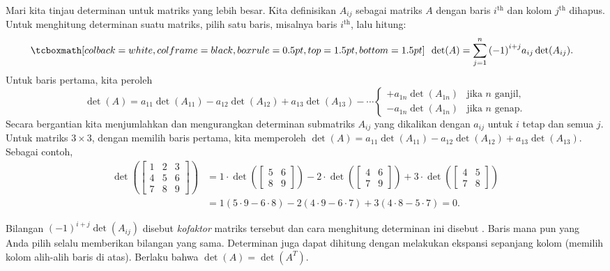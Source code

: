 \medskip

Mari kita tinjau determinan untuk matriks yang lebih besar.  Kita definisikan $A_{ij}$ sebagai
matriks $A$ dengan baris $i^{\text{th}}$ dan kolom $j^{\text{th}}$
dihapus.  Untuk menghitung determinan suatu matriks, pilih satu baris, misalnya
baris $i^{\text{th}}$, lalu hitung:
\begin{equation*}
\mybxbg{~~
\det (A) =
\sum_{j=1}^n
{(-1)}^{i+j}
a_{ij} \det (A_{ij}) .
~~}
\end{equation*}
Untuk baris pertama, kita peroleh
\begin{equation*}
\det (A) =
a_{11} \det (A_{11}) -
a_{12} \det (A_{12}) +
a_{13} \det (A_{13}) -
\cdots
\begin{cases}
+ a_{1n} \det (A_{1n}) & \text{jika } n \text{ ganjil,} \\
- a_{1n} \det (A_{1n}) & \text{jika } n \text{ genap.}
\end{cases}
\end{equation*}
Secara bergantian kita menjumlahkan dan mengurangkan determinan submatriks
$A_{ij}$ yang dikalikan dengan $a_{ij}$ untuk $i$ tetap dan semua $j$.
Untuk matriks $3 \times 3$,
dengan memilih baris pertama, kita memperoleh $\det (A) = a_{11} \det (A_{11}) -
a_{12} \det (A_{12}) + a_{13} \det (A_{13})$.  Sebagai contoh,
\begin{equation*}
\begin{split}
\det \left(
\begin{bmatrix}
1 & 2 & 3 \\
4 & 5 & 6 \\
7 & 8 & 9
\end{bmatrix}
\right)
& =
1 \cdot
\det \left(
\begin{bmatrix}
5 & 6 \\
8 & 9
\end{bmatrix}
\right)
-
2 \cdot
\det \left(
\begin{bmatrix}
4 & 6 \\
7 & 9
\end{bmatrix}
\right)
+
3 \cdot
\det \left(
\begin{bmatrix}
4 & 5 \\
7 & 8
\end{bmatrix}
\right) \\
& =
1 (5 \cdot 9 - 6 \cdot 8)
-
2 (4 \cdot 9 - 6 \cdot 7)
+
3 (4 \cdot 8 - 5 \cdot 7)
= 0 .
\end{split}
\end{equation*}

Bilangan ${(-1)}^{i+j}\det(A_{ij})$ disebut
\emph{kofaktor}
matriks tersebut dan
cara menghitung determinan ini disebut
\emph{}.
Baris mana pun yang Anda pilih selalu memberikan bilangan yang sama.
Determinan juga dapat dihitung dengan melakukan ekspansi
sepanjang kolom (memilih kolom alih-alih baris di atas).
Berlaku bahwa $\det(A) = \det(A^T)$.


